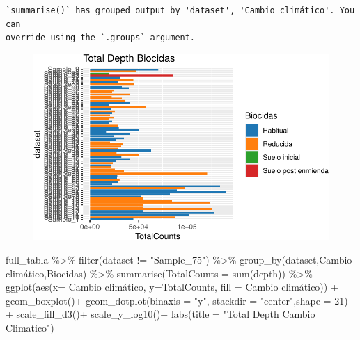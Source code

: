 \documentclass[
  letterpaper,
  DIV=11,
  numbers=noendperiod]{scrartcl}
\newenvironment{Shaded}{\begin{snugshade}}{\end{snugshade}}
\newcommand{\AttributeTok}[1]{\textcolor[rgb]{0.40,0.45,0.13}{#1}}
\newcommand{\DecValTok}[1]{\textcolor[rgb]{0.68,0.00,0.00}{#1}}
\newcommand{\FunctionTok}[1]{\textcolor[rgb]{0.28,0.35,0.67}{#1}}
\newcommand{\NormalTok}[1]{\textcolor[rgb]{0.00,0.23,0.31}{#1}}
\newcommand{\SpecialCharTok}[1]{\textcolor[rgb]{0.37,0.37,0.37}{#1}}
\newcommand{\StringTok}[1]{\textcolor[rgb]{0.13,0.47,0.30}{#1}}
\begin{document}
\begin{verbatim}
`summarise()` has grouped output by 'dataset', 'Cambio climático'. You can
override using the `.groups` argument.
\end{verbatim}

\begin{figure}[H]

{\centering \includegraphics{InformeNeiker_files/figure-pdf/unnamed-chunk-5-2.pdf}

}

\end{figure}

\begin{Shaded}
\begin{Highlighting}[]
\NormalTok{full\_tabla }\SpecialCharTok{\%\textgreater{}\%} \FunctionTok{filter}\NormalTok{(dataset }\SpecialCharTok{!=} \StringTok{"Sample\_75"}\NormalTok{) }\SpecialCharTok{\%\textgreater{}\%} 
  \FunctionTok{group\_by}\NormalTok{(dataset,}\StringTok{\textasciigrave{}}\AttributeTok{Cambio climático}\StringTok{\textasciigrave{}}\NormalTok{,Biocidas) }\SpecialCharTok{\%\textgreater{}\%} 
  \FunctionTok{summarise}\NormalTok{(}\AttributeTok{TotalCounts =} \FunctionTok{sum}\NormalTok{(depth)) }\SpecialCharTok{\%\textgreater{}\%}
  \FunctionTok{ggplot}\NormalTok{(}\FunctionTok{aes}\NormalTok{(}\AttributeTok{x=} \StringTok{\textasciigrave{}}\AttributeTok{Cambio climático}\StringTok{\textasciigrave{}}\NormalTok{, }\AttributeTok{y=}\NormalTok{TotalCounts, }\AttributeTok{fill =} \StringTok{\textasciigrave{}}\AttributeTok{Cambio climático}\StringTok{\textasciigrave{}}\NormalTok{)) }\SpecialCharTok{+} 
  \FunctionTok{geom\_boxplot}\NormalTok{()}\SpecialCharTok{+}
  \FunctionTok{geom\_dotplot}\NormalTok{(}\AttributeTok{binaxis =} \StringTok{"y"}\NormalTok{, }\AttributeTok{stackdir =} \StringTok{"center"}\NormalTok{,}\AttributeTok{shape =} \DecValTok{21}\NormalTok{) }\SpecialCharTok{+}
  \FunctionTok{scale\_fill\_d3}\NormalTok{()}\SpecialCharTok{+}
  \FunctionTok{scale\_y\_log10}\NormalTok{()}\SpecialCharTok{+}
  \FunctionTok{labs}\NormalTok{(}\AttributeTok{title =} \StringTok{"Total Depth Cambio Climatico"}\NormalTok{)}
\end{Highlighting}
\end{Shaded}
\end{document}
